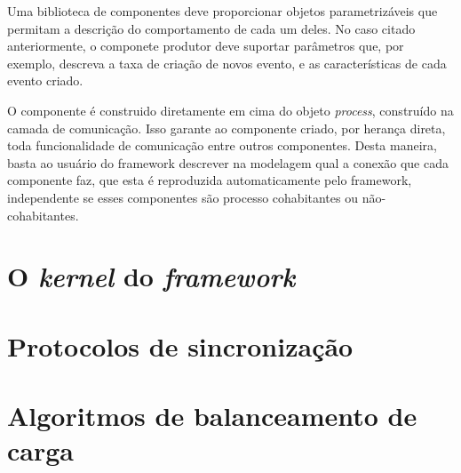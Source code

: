 Uma biblioteca de componentes deve proporcionar objetos parametrizáveis que permitam a descrição do comportamento de cada um deles. No caso citado anteriormente, o componete produtor deve suportar parâmetros que, por exemplo, descreva a taxa de criação de novos evento, e as características de cada evento criado.

O componente é construido diretamente em cima do objeto \textit{process}, construído na camada de comunicação. Isso garante ao componente criado, por herança direta, toda funcionalidade de comunicação entre outros componentes. Desta maneira, basta ao usuário do framework descrever na modelagem qual a conexão que cada componente faz, que esta é reproduzida automaticamente pelo framework, independente se esses componentes são processo cohabitantes ou não-cohabitantes.

\section{O \textit{kernel} do \textit{framework}}
\section{Protocolos de sincronização}
\section{Algoritmos de balanceamento de carga}

